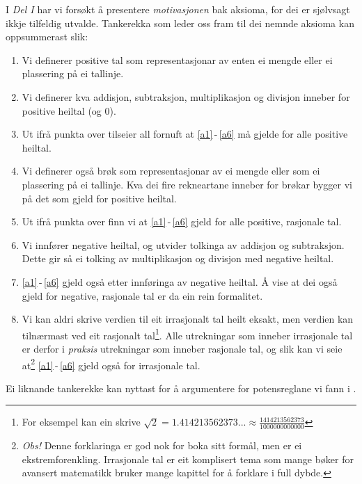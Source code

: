 \newpage
I \textsl{Del I} har vi forsøkt å presentere \textsl{motivasjonen} bak aksioma, for dei er sjølvsagt ikkje tilfeldig utvalde. Tankerekka som leder oss fram til dei nemnde aksioma kan  oppsummerast slik:
\begin{enumerate}
	\item Vi definerer positive tal som representasjonar av enten ei mengde eller ei plassering på ei tallinje.
	\item Vi definerer kva addisjon, subtraksjon, multiplikasjon og divisjon inneber for positive heiltal (og 0).
	\item Ut ifrå punkta over tilseier all fornuft at \eqref{a1}\,-\,\eqref{a6} må gjelde for alle positive heiltal.
	\item Vi definerer også brøk som representasjonar av ei mengde eller som ei plassering på ei tallinje. Kva dei fire rekneartane inneber for brøkar bygger vi på det som gjeld for positive heiltal.
	\item Ut ifrå punkta over finn vi at \eqref{a1}\,-\,\eqref{a6} gjeld for alle positive, rasjonale tal.
	\item Vi innfører negative heiltal, og utvider tolkinga av addisjon og subtraksjon. Dette gir så ei tolking av multiplikasjon og divisjon med negative heiltal.
	\item \eqref{a1}\,-\,\eqref{a6} gjeld også etter innføringa av negative heiltal. Å vise at dei også gjeld for negative, rasjonale tal er da ein rein formalitet.
	\item Vi kan aldri skrive verdien til eit irrasjonalt tal heilt eksakt, men verdien kan tilnærmast ved eit rasjonalt tal\footnote{For eksempel kan ein skrive $ \sqrt{2}=1.414213562373...\approx\frac{1414213562373}{1000000000000} $}. Alle utrekningar som inneber irrasjonale tal er derfor i \textsl{praksis} utrekningar som inneber rasjonale tal, og slik kan vi seie at\footnote{\textit{Obs!} Denne forklaringa er god nok for boka sitt formål, men er ei ekstrem\qquad forenkling. Irrasjonale tal er eit komplisert tema som mange bøker for avansert matematikk bruker mange kapittel for å forklare i full dybde.} \eqref{a1}\,-\,\eqref{a6} gjeld også for irrasjonale tal.
\end{enumerate}
Ei liknande tankerekke kan nyttast for å argumentere for potensreglane vi fann i . 


